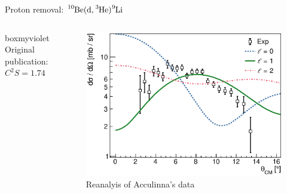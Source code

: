 \documentclass[sans,
frameno, %
mp,
usenames,dvipsnames, %
onlytextwidth, %
t,%
11pt]{beamer}
\newcommand{\iso}[2]{\ce{^{#1}#2}}
\begin{document}
\begin{frame}{Proton removal: $\iso{10}{Be}(\textrm{d}, \iso{3}{He})\iso{9}{Li}$}
{\begin{columns}[t]
{{                    \medskip
                    \hfill
                    \begin{beamercolorbox}[sep=1ex,center, rounded=true, wd=0.95\linewidth]{boxmyviolet}
                        Original publication:\\
                        $C^2S = \qty{1.74}{}$
                    \end{beamercolorbox}
                    \hfill
                }
                {
                    \begin{figure}
                        \centering
                        \captionsetup{belowskip=-8pt}
                        \caption{Reanalyis of Acculinna's data}
                        \includegraphics[width=\linewidth, cfbox=Mulberry 1pt 0pt 0pt]{figures/Workshop/acculina.eps}%
                    \end{figure}

}}
\end{columns}}
\end{frame}
\end{document}

